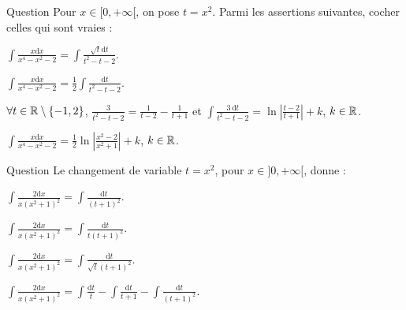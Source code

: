 \begin{multi}[multiple,feedback=
{Avec \(t= x^2\), on a : \(\mathrm{d}t=2x\mathrm{d}x\) et 
\(\displaystyle \int \frac{\mathrm{d}x}{x^4-x^2-2}=\frac{1}{2}\int \frac{\mathrm{d}t}{(t-2)(t+1)}\). Or, \(\forall t\in \Rr\setminus \{-1,2\}\), \(\displaystyle \frac{3}{t^2-t-2}=\frac{1}{t-2}-\frac{1}{t+1}\). Donc \(\displaystyle \int \frac{3\, \mathrm{d}t}{t^2-t-2}=\ln\left|\frac{t-2}{t+1}\right|+k\), \(k\in \Rr\), et ensuite : 
\(\displaystyle \int \frac{x\mathrm{d}x}{x^4-x^2-2}=\frac{1}{6}\ln\left|\frac{x^2-2}{x^2+1}\right|+k\), \(k\in \Rr\).
}]{Question}
Pour \(x\in [0,+\infty[\), on pose \(t=x^2\). Parmi les assertions suivantes, cocher celles qui sont vraies :

    \item \(\displaystyle \int \frac{x\mathrm{d}x}{x^4-x^2-2}=\int \frac{\sqrt{t}\mathrm{d}t}{t^2-t-2}\).
    \item* \(\displaystyle \int \frac{x\mathrm{d}x}{x^4-x^2-2}=\frac{1}{2}\int \frac{\mathrm{d}t}{t^2-t-2}\).
    \item* \(\forall t\in \Rr\setminus \{-1,2\}\), \(\displaystyle \frac{3}{t^2-t-2}=\frac{1}{t-2}-\frac{1}{t+1}\) et \(\displaystyle \int \frac{3\, \mathrm{d}t}{t^2-t-2}=\ln\left|\frac{t-2}{t+1}\right|+k\), \(k\in \Rr\).
    \item \(\displaystyle \int \frac{x\mathrm{d}x}{x^4-x^2-2}=\frac{1}{2}\ln\left|\frac{x^2-2}{x^2+1}\right|+k\), \(k\in \Rr\).
\end{multi}


\begin{multi}[multiple,feedback=
{Avec \(t= x^2\), on a : \(\mathrm{d}t=2x\mathrm{d}x\) et 
\[\int \frac{2\mathrm{d}x}{x(x^2+1)^2}=\int \frac{2x\mathrm{d}x}{x^2(x^2+1)^2}=\int \frac{\mathrm{d}t}{t(t+1)^2}.\]
Ensuite, on décompose en éléments simples donne :
\[\frac{1}{t(t+1)^2}=\frac{1}{t}-\frac{1}{t+1}-\frac{1}{(t+1)^2}.\]
}]{Question}
Le changement de variable \(t=x^2\), pour \(x\in ]0,+\infty[\), donne :

    \item \(\displaystyle \int \frac{2\mathrm{d}x}{x(x^2+1)^2}=\int \frac{\mathrm{d}t}{(t+1)^2}\).
    \item* \(\displaystyle \int \frac{2\mathrm{d}x}{x(x^2+1)^2}=\int \frac{\mathrm{d}t}{t(t+1)^2}\).
    \item \(\displaystyle \int \frac{2\mathrm{d}x}{x(x^2+1)^2}=\int \frac{\mathrm{d}t}{\sqrt{t}(t+1)^2}\).
    \item* \(\displaystyle \int \frac{2\mathrm{d}x}{x(x^2+1)^2}=\int \frac{\mathrm{d}t}{t}-\int \frac{\mathrm{d}t}{t+1}-\int \frac{\mathrm{d}t}{(t+1)^2}\).
\end{multi}


